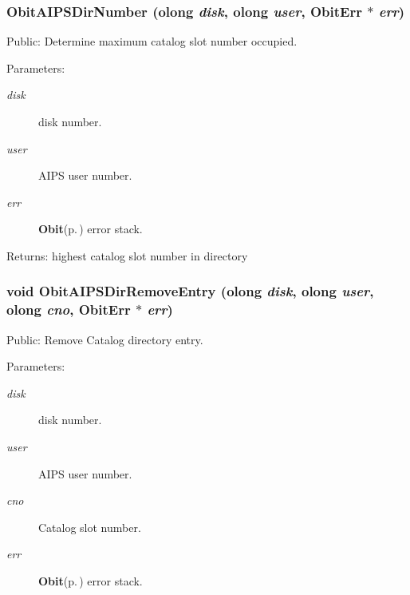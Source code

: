 \subsubsection{ Obit\-AIPSDir\-Number ({\bf olong} {\em disk}, {\bf olong} {\em user}, {\bf Obit\-Err} $\ast$ {\em err})}\label{ObitAIPSDir_8c_a22}


Public: Determine maximum catalog slot number occupied. 

\begin{Desc}
\item[Parameters:]
\begin{description}
\item[{\em disk}]disk number. \item[{\em user}]AIPS user number. \item[{\em err}]{\bf Obit}{\rm (p.\,\pageref{structObit})} error stack. \end{description}
\end{Desc}
\begin{Desc}
\item[Returns:]highest catalog slot number in directory \end{Desc}
\subsubsection{\setlength{\rightskip}{0pt plus 5cm}void Obit\-AIPSDir\-Remove\-Entry ({\bf olong} {\em disk}, {\bf olong} {\em user}, {\bf olong} {\em cno}, {\bf Obit\-Err} $\ast$ {\em err})}\label{ObitAIPSDir_8c_a21}


Public: Remove Catalog directory entry. 

\begin{Desc}
\item[Parameters:]
\begin{description}
\item[{\em disk}]disk number. \item[{\em user}]AIPS user number. \item[{\em cno}]Catalog slot number. \item[{\em err}]{\bf Obit}{\rm (p.\,\pageref{structObit})} error stack. \end{description}
\end{Desc}
